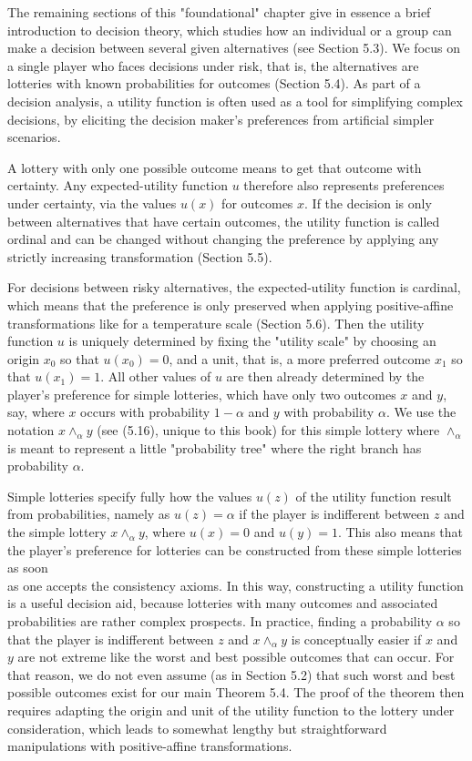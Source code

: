\documentclass[12pt]{article}
\begin{document}
The remaining sections of this "foundational" chapter give in essence a brief introduction to decision theory, which studies how an individual or a group can make a decision between several given alternatives (see Section 5.3). We focus on a single player who faces decisions under risk, that is, the alternatives are lotteries with known probabilities for outcomes (Section 5.4). As part of a decision analysis, a utility function is often used as a tool for simplifying complex decisions, by eliciting the decision maker's preferences from artificial simpler scenarios.

A lottery with only one possible outcome means to get that outcome with certainty. Any expected-utility function $u$ therefore also represents preferences under certainty, via the values $u(x)$ for outcomes $x$. If the decision is only between alternatives that have certain outcomes, the utility function is called ordinal and can be changed without changing the preference by applying any strictly increasing transformation (Section 5.5).

For decisions between risky alternatives, the expected-utility function is cardinal, which means that the preference is only preserved when applying positive-affine transformations like for a temperature scale (Section 5.6). Then the utility function $u$ is uniquely determined by fixing the "utility scale" by choosing an origin $x_{0}$ so that $u\left(x_{0}\right)=0$, and a unit, that is, a more preferred outcome $x_{1}$ so that $u\left(x_{1}\right)=1$. All other values of $u$ are then already determined by the player's preference for simple lotteries, which have only two outcomes $x$ and $y$, say, where $x$ occurs with probability $1-\alpha$ and $y$ with probability $\alpha$. We use the notation $x \wedge_{\alpha} y$ (see (5.16), unique to this book) for this simple lottery where $\wedge_{\alpha}$ is meant to represent a little "probability tree" where the right branch has probability $\alpha$.

Simple lotteries specify fully how the values $u(z)$ of the utility function result from probabilities, namely as $u(z)=\alpha$ if the player is indifferent between $z$ and the simple lottery $x \wedge_{\alpha} y$, where $u(x)=0$ and $u(y)=1$. This also means that the player's preference for lotteries can be constructed from these simple lotteries as soon\\
as one accepts the consistency axioms. In this way, constructing a utility function is a useful decision aid, because lotteries with many outcomes and associated probabilities are rather complex prospects. In practice, finding a probability $\alpha$ so that the player is indifferent between $z$ and $x \wedge_{\alpha} y$ is conceptually easier if $x$ and $y$ are not extreme like the worst and best possible outcomes that can occur. For that reason, we do not even assume (as in Section 5.2) that such worst and best possible outcomes exist for our main Theorem 5.4. The proof of the theorem then requires adapting the origin and unit of the utility function to the lottery under consideration, which leads to somewhat lengthy but straightforward manipulations with positive-affine transformations.
\end{document}
